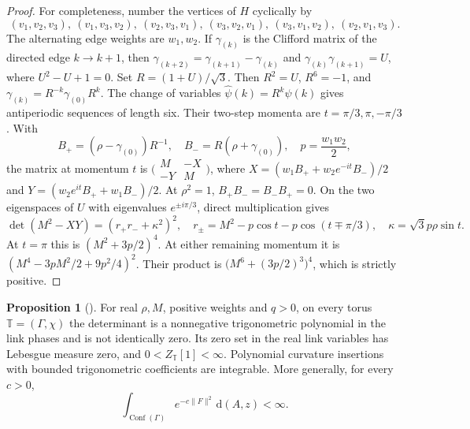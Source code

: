 \documentclass[11pt,letterpaper,reqno]{amsart}
\theoremstyle{definition}
\newtheorem{qcmproposition}{Proposition}[section]
\newenvironment{proposition}[1][]{\pushQED{\qed}\renewcommand{\qedsymbol}{$\blacksquare$}\begin{qcmproposition}[#1]}{\popQED\end{qcmproposition}}
\begin{document}
\begin{proof}
For completeness, number the vertices of $H$ cyclically by
\[
 (v_1,v_2,v_3),\ (v_1,v_3,v_2),\ (v_2,v_3,v_1),\
 (v_3,v_2,v_1),\ (v_3,v_1,v_2),\ (v_2,v_1,v_3).
\]
The alternating edge weights are $w_1,w_2$. If $\gamma_{(k)}$ is
the Clifford matrix of the directed edge $k\to k+1$, then
$\gamma_{(k+2)}=\gamma_{(k+1)}-\gamma_{(k)}$ and
$\gamma_{(k)}\gamma_{(k+1)}=U$, where $U^2-U+1=0$.
Set $R=(1+U)/\sqrt3$. Then $R^2=U$, $R^6=-1$, and
$\gamma_{(k)}=R^{-k}\gamma_{(0)}R^k$.
The change of variables $\widehat\psi(k)=R^k\psi(k)$ gives
antiperiodic sequences of length six. Their two-step momenta are
$t=\pi/3,\pi,-\pi/3$. With
\[
 B_+=(\rho-\gamma_{(0)})R^{-1},\quad
 B_-=R(\rho+\gamma_{(0)}),\quad p=\frac{w_1w_2}{2},
\]
the matrix at momentum $t$ is
$\bigl(\begin{smallmatrix}M&-X\\-Y&M\end{smallmatrix}\bigr)$,
where $X=(w_1B_++w_2e^{-it}B_-)/2$ and
$Y=(w_2e^{it}B_++w_1B_-)/2$.
At $\rho^2=1$, $B_+B_-=B_-B_+=0$. On the two eigenspaces of $U$
with eigenvalues $e^{\pm i\pi/3}$, direct multiplication gives
\[
 \det(M^2-XY)=(r_+r_-+\kappa^2)^2,\quad
 r_\pm=M^2-p\cos t-p\cos(t\mp\pi/3),\quad
 \kappa=\sqrt3p\rho\sin t.
\]
At $t=\pi$ this is $(M^2+3p/2)^4$. At either remaining momentum
it is $(M^4-3pM^2/2+9p^2/4)^2$. Their product is
$\bigl(M^6+(3p/2)^3\bigr)^4$, which is strictly positive.
\end{proof}

\begin{proposition}\label{qcm:lattice-normalization}
For real $\rho,M$, positive weights and $q>0$, on every torus
$\mathbb T=(\Gamma,\chi)$ the determinant is a nonnegative
trigonometric polynomial in the link phases and is not identically
zero. Its zero set in the real link variables has Lebesgue measure
zero, and $0<Z_{\mathbb T}[1]<\infty$. Polynomial curvature
insertions with bounded trigonometric coefficients are integrable.
More generally, for every $c>0$,
\[
 \int_{\operatorname{Conf}(\Gamma)}
       e^{-c\|F\|^2}\,\mathrm d(A,z)<\infty.
\]
\end{proposition}
\end{document}
